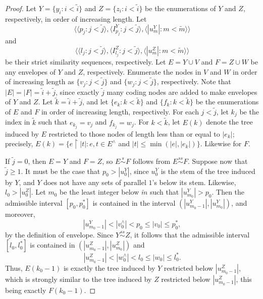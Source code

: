 \documentclass{amsart}
\theoremstyle{remark}
\theoremstyle{definition}
\theoremstyle{remark}
\newcommand{\re}{\restriction}
\newcommand{\ssim}{\stackrel{s}{\sim}}
\newcommand{\sssim}{\stackrel{ss}{\sim}}
\newcommand{\lgl}{\langle}
\newcommand{\rgl}{\rangle}
\begin{document}
\begin{proof}
Let $Y=\{y_i:i<\tilde{i}\}$ and $Z=\{z_i:i<\tilde{i}\}$ be the enumerations of $Y$ and $Z$, respectively, in order of increasing length.
Let
\begin{equation}
\lgl \lgl p_j:j<\tilde{j}\rgl,\lgl I^Y_{p_j}:j<\tilde{j}\rgl, \lgl |u^Y_m|:m<\tilde{m}\rgl\rgl
\end{equation}
and
\begin{equation}
\lgl \lgl l_j:j<\tilde{j}\rgl,\lgl I^Z_{l_j}:j<\tilde{j}\rgl, \lgl |u^Z_m|:m<\tilde{m}\rgl\rgl
\end{equation}
be their strict similarity sequences, respectively.
Let $E=Y\cup V$ and $F=Z\cup W$ be any envelopes of $Y$ and $Z$, respectively.
Enumerate the nodes in  $V$ and $W$ in order of increasing length as $\{v_j:j<\tilde{j}\}$ and $\{w_j:j<\tilde{j}\}$, respectively.
Note that $|E|=|F|=\tilde{i}+\tilde{j}$,
since exactly $\tilde{j}$ many coding nodes are added to make envelopes of $Y$ and $Z$.
Let $\tilde{k}=\tilde{i}+\tilde{j}$,
and let $\{e_k:k<\tilde{k}\}$ and $\{f_k:k<\tilde{k}\}$ be the enumerations of $E$ and $F$ in order of increasing length, respectively.
For each $j<\tilde{j}$,
let $k_j$ be the index in $\tilde{k}$ such that
$e_{k_j}=v_j$ and $f_{k_j}=w_j$.
For  $k<\tilde{k}$,
let $E(k)$ denote
the tree induced by $E$ restricted to those nodes of length less than or equal to $|e_k|$; precisely,
$E(k)=\{e\re |t|: e, t\in E^{\wedge}$ and $ |t|\le \min(|e|,|e_k|)\}$.
Likewise for $F$.


If $\tilde{j}=0$, then $E=Y$ and $F=Z$, so $E\ssim F$ follows from $E\sssim F$.
Suppose now that $\tilde{j}\ge 1$.
It must be the case that $p_0>|u^Y_0|$,
since $u^Y_0$ is the stem of the tree induced by $Y$,
and $Y$ does not have any sets of parallel $1$'s below its stem.
Likewise, $l_0>|u^Z_0|$.
Let $m_0$  be the least  integer below $\tilde{m}$  such that
 $|u^Y_{m_0}|>p_0$.
Then the admissible interval $[p_0,p^*_0]$ is contained in the interval $(|u^Y_{m_0-1}|,|u^Y_{m_0}|)$,
and  moreover,
\begin{equation}
|u^Y_{m_0-1}|<|v_0^{\wedge}|<p_0\le
|v_0|\le p_0^*,
\end{equation}
 by  the definition of envelope.
Since $Y\sssim Z$,
it follows that the admissible interval $[l_0,l_0^*]$ is contained in $(|u^Z_{m_0-1}|,|u^Z_{m_0}|)$
and
\begin{equation}
|u^Z_{m_0-1}|<|w_0^{\wedge}|<l_0\le
|w_0|\le l_0^*.
\end{equation}
Thus,
$E(k_0-1)$ is exactly the tree induced by  $Y$ restricted below $|u^Z_{m_0-1}|$,
which is strongly similar to
the tree induced by $Z$ restricted below
$|u^Z_{m_0-1}|$,
this being exactly
$F(k_0-1)$.





\end{proof}
\end{document}
